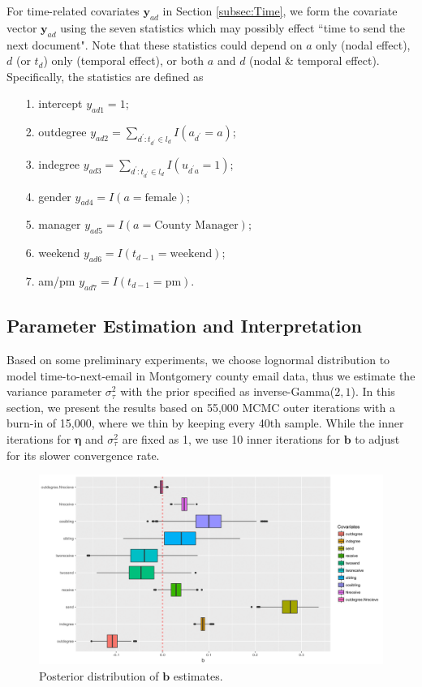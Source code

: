 \documentclass[12pt]{article}
\begin{document}
For time-related covariates $\boldsymbol{y}_{ad}$ in Section \ref{subsec:Time}, we form the covariate vector $\boldsymbol{y}_{ad}$ using the seven statistics which may possibly effect ``time to send the next document". Note that these statistics could depend on $a$ only (nodal effect), $d$ (or $t_d$) only (temporal effect), or both $a$ and $d$ (nodal \& temporal effect). Specifically, the statistics are defined as
\begin{itemize}
	\item[1.] intercept ${y}_{ad1} =1$;
	\item[2.] outdegree ${y}_{ad2} =\sum\limits_{d^\prime: t_{d^\prime} \in l_d} I(a_{d^\prime} = a)$;
	\item[3.] indegree ${y}_{ad3}=\sum\limits_{d^\prime: t_{d^\prime} \in l_d} I(u_{d^\prime a} = 1)$;
	\item[4.] gender ${y}_{ad4}=I(a= \mbox{female})$;
	\item[5.] manager ${y}_{ad5}=I(a= \mbox{County Manager})$;
	\item[6.] weekend ${y}_{ad6} = I(t_{d-1}= \mbox{weekend})$;
	\item[7.] am/pm ${y}_{ad7}= I(t_{d-1}= \mbox{pm})$.
\end{itemize}
\subsection{Parameter Estimation and Interpretation}\label{subsec:Result_email}
Based on some preliminary experiments, we choose lognormal distribution to model time-to-next-email in Montgomery county email data, thus we estimate the variance parameter $\sigma_\tau^2$ with the prior specified as inverse-Gamma($2, 1$). In this section, we present the results based on 55,000 MCMC outer iterations with a burn-in of 15,000, where we thin by keeping every 40th sample. While the inner iterations for $\boldsymbol{\eta}$ and $\sigma_\tau^2$ are fixed as 1, we use 10 inner iterations for $\boldsymbol{b}$ to adjust for its slower convergence rate.
	\begin{figure}[!b]
	\centering
	\includegraphics[width=1\textwidth]{plots_paper/best-1.png}	
	\caption {Posterior distribution of $\boldsymbol{b}$ estimates.}
	\label{figure:betaresults}
\end{figure}
	
\end{document}
